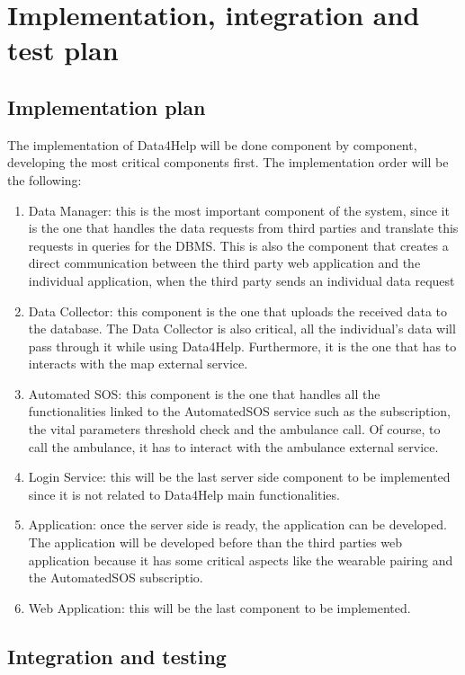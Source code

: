 \chapter{Implementation, integration and test plan}
\section{Implementation plan}
The implementation of Data4Help will be done component by component, developing the most critical components first.
The implementation order will be the following:
\begin{enumerate}
\item Data Manager: this is the most important component of the system, since it is the one that handles the data requests from third parties and translate this requests in queries for the DBMS. 
This is also the component that creates a direct communication between the third party web application and the individual application, when the third party sends an individual data request
\item Data Collector: this component is the one that uploads the received data to the database. The Data Collector is also critical, all the individual's data will pass through it while using Data4Help. Furthermore, it is the one that has to interacts with the map external service.
\item Automated SOS: this component is the one that handles all the functionalities linked to the AutomatedSOS service such as the subscription, the vital parameters threshold check and the ambulance call. Of course, to call the ambulance, it has to interact with the ambulance external service.
\item Login Service: this will be the last server side component to be implemented since it is not related to Data4Help main functionalities.
\item Application: once the server side is ready, the application can be developed. The application will be developed before than the third parties web application because it has some critical aspects like the wearable pairing and the AutomatedSOS subscriptio.
\item Web Application: this will be the last component to be implemented.
\end{enumerate}

\section{Integration and testing} 

